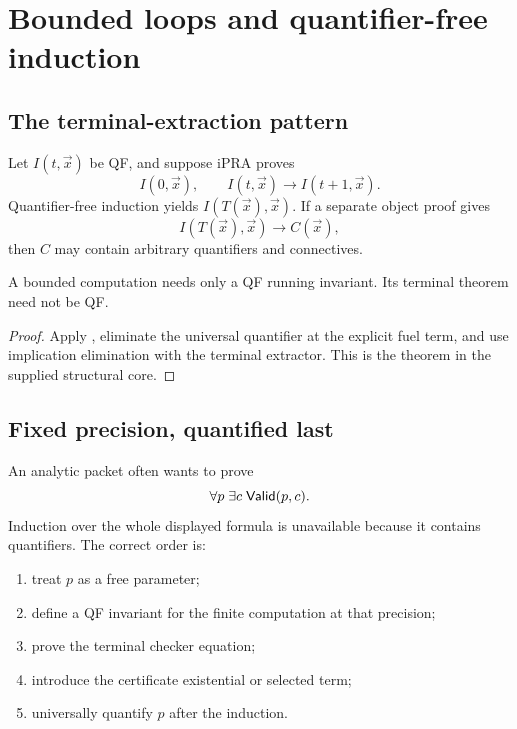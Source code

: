 \section{Bounded loops and quantifier-free induction}

\subsection{The terminal-extraction pattern}

Let \(I(t,\vec x)\) be QF, and suppose iPRA proves
\[
 I(0,\vec x),
 \qquad
 I(t,\vec x)\to I(t+1,\vec x).
\]
Quantifier-free induction yields \(I(T(\vec x),\vec x)\).  If a separate object
proof gives
\[
 I(T(\vec x),\vec x)\to C(\vec x),
\]
then \(C\) may contain arbitrary quantifiers and connectives.

\begin{proposition}\label{prop:qf-loop}
A bounded computation needs only a QF running invariant.  Its terminal theorem
need not be QF.
\end{proposition}

\begin{proof}
Apply , eliminate the universal quantifier at the explicit
fuel term, and use implication elimination with the terminal extractor.  This
is the theorem  in the supplied structural core.
\end{proof}

\subsection{Fixed precision, quantified last}

An analytic packet often wants to prove
\[
  \forall p\;\exists c\;\mathsf{Valid}(p,c).
\]
Induction over the whole displayed formula is unavailable because it contains
quantifiers.  The correct order is:

\begin{enumerate}
\item treat \(p\) as a free parameter;
\item define a QF invariant for the finite computation at that precision;
\item prove the terminal checker equation;
\item introduce the certificate existential or selected term;
\item universally quantify \(p\) after the induction.
\end{enumerate}

